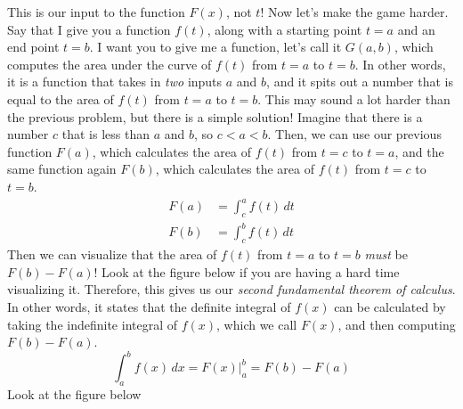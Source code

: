 \documentclass{article}
\begin{document}
  This is our input to the function $F(x)$, not $t$! Now let's make the game harder. Say that I give you a function $f(t)$, along with a starting point $t=a$ and an end point $t=b$. I want you to give me a function, let's call it $G(a, b)$, which computes the area under the curve of $f(t)$ from $t=a$ to $t=b$. In other words, it is a function that takes in \textit{two} inputs $a$ and $b$, and it spits out a number that is equal to the area of $f(t)$ from $t=a$ to $t=b$. This may sound a lot harder than the previous problem, but there is a simple solution! Imagine that there is a number $c$ that is less than $a$ and $b$, so $c < a < b$. Then, we can use our previous function $F(a)$, which calculates the area of $f(t)$ from $t=c$ to $t=a$, and the same function again $F(b)$, which calculates the area of $f(t)$ from $t=c$ to $t=b$. 
  \begin{align}
    F(a) & = \int_c^a f(t)\,dt \\
    F(b) & = \int_c^b f(t)\,dt 
  \end{align} 
  Then we can visualize that the area of $f(t)$ from $t=a$ to $t=b$ \textit{must} be $F(b) - F(a)$! Look at the figure below if you are having a hard time visualizing it. Therefore, this gives us our \textit{second fundamental theorem of calculus}. In other words, it states that the definite integral of $f(x)$ can be calculated by taking the indefinite integral of $f(x)$, which we call $F(x)$, and then computing $F(b) - F(a)$. 
  \begin{equation}
    \int_a^b f(x) \,dx = F(x) \big|_a^b = F(b) - F(a)
  \end{equation} 
  Look at the figure below 
\end{document}
